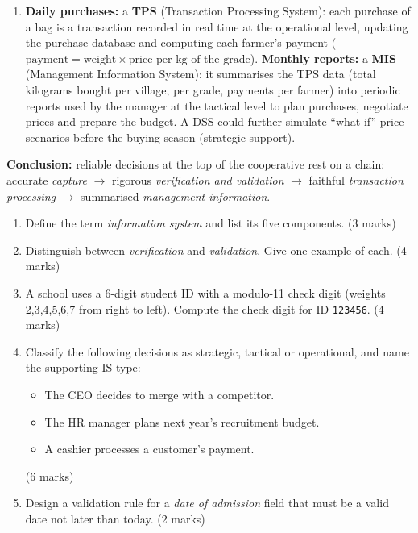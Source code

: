 \documentclass[11pt]{article}
\begin{document}
\begin{exoresolu}
\begin{enumerate}
\begin{itemize}
\item (Also acceptable: \textbf{presence check} — farmer number, weight and grade must all be entered before the record is saved.)
\end{itemize}
\item[c)] \textbf{Daily purchases:} a \textbf{TPS} (Transaction Processing System): each purchase of a bag is a transaction recorded in real time at the operational level, updating the purchase database and computing each farmer's payment ($\text{payment} = \text{weight} \times \text{price per kg of the grade}$).
\textbf{Monthly reports:} a \textbf{MIS} (Management Information System): it summarises the TPS data (total kilograms bought per village, per grade, payments per farmer) into periodic reports used by the manager at the tactical level to plan purchases, negotiate prices and prepare the budget. A DSS could further simulate ``what-if'' price scenarios before the buying season (strategic support).
\end{enumerate}
\textbf{Conclusion:} reliable decisions at the top of the cooperative rest on a chain: accurate \emph{capture} $\rightarrow$ rigorous \emph{verification and validation} $\rightarrow$ faithful \emph{transaction processing} $\rightarrow$ summarised \emph{management information}.
\end{exoresolu}

\begin{exercice}
\begin{enumerate}
\item Define the term \emph{information system} and list its five components. \hfill (3 marks)
\item Distinguish between \emph{verification} and \emph{validation}. Give one example of each. \hfill (4 marks)
\item A school uses a 6-digit student ID with a modulo-11 check digit (weights 2,3,4,5,6,7 from right to left). Compute the check digit for ID \texttt{123456}. \hfill (4 marks)
\item Classify the following decisions as strategic, tactical or operational, and name the supporting IS type:
\begin{itemize}
\item The CEO decides to merge with a competitor.
\item The HR manager plans next year's recruitment budget.
\item A cashier processes a customer's payment.
\end{itemize}
\hfill (6 marks)
\item Design a validation rule for a \emph{date of admission} field that must be a valid date not later than today. \hfill (2 marks)
\end{enumerate}
\end{exercice}
\end{document}
